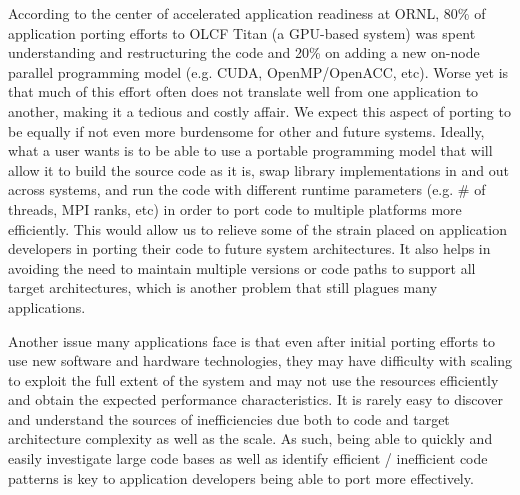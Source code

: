 According to the center of accelerated application readiness at ORNL, 80\% of application porting efforts to OLCF Titan 
(a \acs{GPU}-based system) was spent understanding and restructuring the code and 20\% on adding a new on-node parallel programming model (e.g. CUDA, OpenMP/OpenACC, etc). 
Worse yet is that much of this effort often does not translate well from one application to another, making it a tedious and costly affair.
We expect this aspect of porting to be equally if not even more burdensome for other and future systems.
Ideally, what a user wants is to be able to use a portable programming model that will allow it to build the source code as it is, swap library implementations in and out across systems, and run the code with different runtime parameters (e.g. \# of threads, MPI ranks, etc) in order to port code to multiple platforms more efficiently. This would allow us to relieve some of the strain placed on application developers in porting their code to future system architectures.
It also helps in avoiding the need to maintain multiple versions or code paths to support all target architectures, which is another problem that still plagues many applications.

Another issue many applications face is that even after initial porting efforts to use new software and hardware technologies, they may have difficulty with scaling to exploit the full extent of the system and may not use the resources efficiently and obtain the expected performance characteristics.
It is rarely easy to discover and understand the sources of inefficiencies due both to code and target architecture complexity as well as the scale.
As such, being able to quickly and easily investigate large code bases as well as identify efficient / inefficient code patterns is key to application developers being able to port more effectively.




